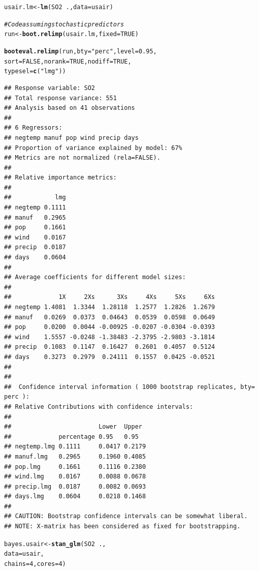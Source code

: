 \documentclass[11pt,a4paper,twoside]{book}
\makeatletter
\newcommand{\hlnum}[1]{\textcolor[rgb]{0.686,0.059,0.569}{#1}}%
\newcommand{\hlstr}[1]{\textcolor[rgb]{0.192,0.494,0.8}{#1}}%
\newcommand{\hlcom}[1]{\textcolor[rgb]{0.678,0.584,0.686}{\textit{#1}}}%
\newcommand{\hlopt}[1]{\textcolor[rgb]{0,0,0}{#1}}%
\newcommand{\hlstd}[1]{\textcolor[rgb]{0.345,0.345,0.345}{#1}}%
\newcommand{\hlkwb}[1]{\textcolor[rgb]{0.69,0.353,0.396}{#1}}%
\newcommand{\hlkwc}[1]{\textcolor[rgb]{0.333,0.667,0.333}{#1}}%
\newcommand{\hlkwd}[1]{\textcolor[rgb]{0.737,0.353,0.396}{\textbf{#1}}}%
\newenvironment{kframe}{%
 \def\at@end@of@kframe{}%
 \ifinner\ifhmode%
  \def\at@end@of@kframe{\end{minipage}}%
  \begin{minipage}{\columnwidth}%
 \fi\fi%
 \def\FrameCommand##1{\hskip\@totalleftmargin \hskip-\fboxsep
 \colorbox{shadecolor}{##1}\hskip-\fboxsep
     \hskip-\linewidth \hskip-\@totalleftmargin \hskip\columnwidth}%
 \MakeFramed {\advance\hsize-\width
   \@totalleftmargin\z@ \linewidth\hsize
   \@setminipage}}%
 {\par\unskip\endMakeFramed%
 \at@end@of@kframe}
\newenvironment{knitrout}{}{} %
\makeatother
\begin{document}
\begin{knitrout}
\color{fgcolor}\begin{kframe}
\begin{alltt}
\hlstd{usair.lm} \hlkwb{<-} \hlkwd{lm}\hlstd{(SO2}\hlopt{~}\hlstd{.,} \hlkwc{data} \hlstd{= usair)}


\hlcom{#Code assuming stochastic predictors}
\hlstd{run}\hlkwb{<-}\hlkwd{boot.relimp}\hlstd{(usair.lm,} \hlkwc{fixed}\hlstd{=}\hlnum{TRUE}\hlstd{)}

\hlkwd{booteval.relimp}\hlstd{(run,} \hlkwc{bty} \hlstd{=} \hlstr{"perc"}\hlstd{,} \hlkwc{level} \hlstd{=} \hlnum{0.95}\hlstd{,}
                \hlkwc{sort} \hlstd{=} \hlnum{FALSE}\hlstd{,} \hlkwc{norank} \hlstd{=} \hlnum{TRUE}\hlstd{,} \hlkwc{nodiff} \hlstd{=} \hlnum{TRUE}\hlstd{,}
                \hlkwc{typesel} \hlstd{=} \hlkwd{c}\hlstd{(}\hlstr{"lmg"}\hlstd{))}
\end{alltt}
\begin{verbatim}
## Response variable: SO2 
## Total response variance: 551 
## Analysis based on 41 observations 
## 
## 6 Regressors: 
## negtemp manuf pop wind precip days 
## Proportion of variance explained by model: 67%
## Metrics are not normalized (rela=FALSE). 
## 
## Relative importance metrics: 
## 
##            lmg
## negtemp 0.1111
## manuf   0.2965
## pop     0.1661
## wind    0.0167
## precip  0.0187
## days    0.0604
## 
## Average coefficients for different model sizes: 
## 
##             1X     2Xs      3Xs     4Xs     5Xs     6Xs
## negtemp 1.4081  1.3344  1.28118  1.2577  1.2826  1.2679
## manuf   0.0269  0.0373  0.04643  0.0539  0.0598  0.0649
## pop     0.0200  0.0044 -0.00925 -0.0207 -0.0304 -0.0393
## wind    1.5557 -0.0248 -1.38483 -2.3795 -2.9803 -3.1814
## precip  0.1083  0.1147  0.16427  0.2601  0.4057  0.5124
## days    0.3273  0.2979  0.24111  0.1557  0.0425 -0.0521
## 
##  
##  Confidence interval information ( 1000 bootstrap replicates, bty= perc ): 
## Relative Contributions with confidence intervals: 
##  
##                        Lower  Upper
##             percentage 0.95   0.95  
## negtemp.lmg 0.1111     0.0417 0.2179
## manuf.lmg   0.2965     0.1960 0.4085
## pop.lmg     0.1661     0.1116 0.2380
## wind.lmg    0.0167     0.0088 0.0678
## precip.lmg  0.0187     0.0082 0.0693
## days.lmg    0.0604     0.0218 0.1468
## 
## CAUTION: Bootstrap confidence intervals can be somewhat liberal. 
## NOTE: X-matrix has been considered as fixed for bootstrapping.
\end{verbatim}
\begin{alltt}
\hlstd{bayes.usair} \hlkwb{<-} \hlkwd{stan_glm}\hlstd{(SO2} \hlopt{~} \hlstd{. ,}
                  \hlkwc{data} \hlstd{= usair,}
                  \hlkwc{chains} \hlstd{=} \hlnum{4}\hlstd{,} \hlkwc{cores} \hlstd{=} \hlnum{4}\hlstd{)}


\end{alltt}
\end{kframe}
\end{knitrout}
\end{document}
